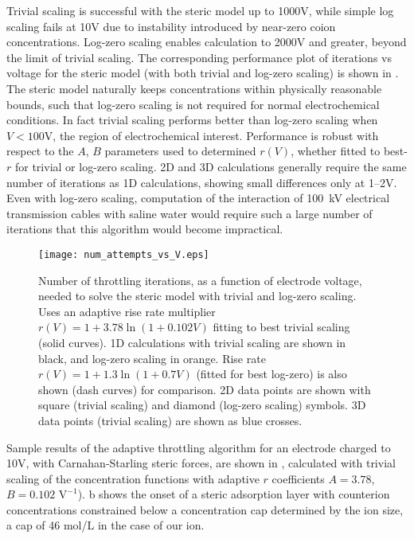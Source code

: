 Trivial scaling is successful with the steric model up to 1000V, while simple log
scaling fails at 10V due to instability introduced by near-zero coion
concentrations.
Log-zero scaling enables calculation to 2000V
and greater, beyond the limit of trivial scaling.
The corresponding
performance plot of iterations vs voltage for the steric model
(with both trivial and log-zero scaling) is shown in .
 The steric model
naturally keeps concentrations within 
physically reasonable bounds, such that  log-zero scaling is not
required for normal electrochemical conditions. In fact
trivial scaling performs better than log-zero scaling when $V<100$V,
the region of electrochemical interest.
Performance is robust with respect to the $A$, $B$ parameters used to
determined $r(V)$, whether fitted to best-$r$ for trivial or log-zero scaling.
2D and 3D calculations generally require the same number of iterations
as 1D calculations, showing small differences only at 1--2V.
Even with log-zero scaling, computation of the interaction of
100~kV electrical transmission cables with saline water would require
such a large number of iterations that this algorithm would become impractical.

\begin{figure}
\centering
\texttt{[image: num\_attempts\_vs\_V.eps]}
\caption{Number of throttling iterations,  as a function of electrode
  voltage, needed to solve the steric model with trivial and log-zero scaling.
  Uses an adaptive rise rate multiplier
  $r(V)=1+3.78\ln(1+0.102V)$ fitting to best trivial scaling (solid
  curves). 1D calculations with trivial scaling are shown in black,
  and log-zero scaling in orange. Rise rate $r(V)=1+1.3 \ln(1+0.7V)$
  (fitted for best log-zero) is also shown (dash curves) for
  comparison. 2D data points are shown with square (trivial scaling) and
  diamond (log-zero scaling) symbols. 3D data points (trivial scaling) are
  shown as blue crosses.
}
\label{fig:convergence}
\end{figure}


Sample results of the adaptive throttling algorithm for an electrode charged to
10V, with Carnahan-Starling steric forces, are shown in
, calculated with trivial scaling of the
concentration functions with adaptive $r$ coefficients $A=3.78$, $B=0.102 \textrm{ V}^{-1}$). b shows the onset
of a steric adsorption layer \citep{DagmawiParsons2022} with counterion
concentrations constrained below a concentration cap determined by the
ion size, a cap of 46 mol/L in the case of our  ion.

